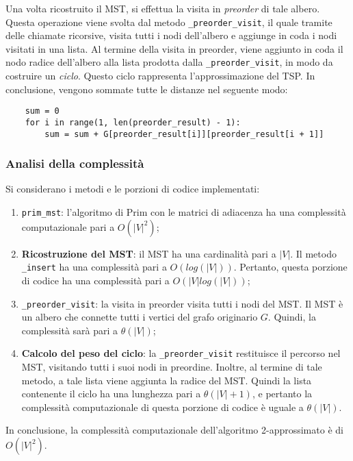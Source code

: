 Una volta ricostruito il MST, si effettua la visita in \textit{preorder} di tale albero. 
Questa operazione viene svolta dal metodo \verb|_preorder_visit|, il quale tramite 
delle chiamate ricorsive, visita tutti i nodi dell'albero e aggiunge in coda i nodi 
visitati in una lista. Al termine della visita in preorder, viene aggiunto in coda 
il nodo radice dell'albero alla lista prodotta dalla \verb|_preorder_visit|, in modo da 
costruire un \textit{ciclo}. Questo ciclo rappresenta l'approssimazione del TSP. 
In conclusione, vengono sommate tutte le distanze nel seguente modo:
\begin{verbatim}
    sum = 0
    for i in range(1, len(preorder_result) - 1):
        sum = sum + G[preorder_result[i]][preorder_result[i + 1]]
\end{verbatim}

\subsubsection{Analisi della complessità}

Si considerano i metodi e le porzioni di codice implementati:
\begin{enumerate}
    \item \verb|prim_mst|: l'algoritmo di Prim con le matrici di adiacenza ha una complessità 
    computazionale pari a $O(|V|^2)$;
    \item \textbf{Ricostruzione del MST}: il MST ha una cardinalità pari a $|V|$. Il metodo 
    \verb|_insert| ha una complessità pari a $O(log(|V|))$. Pertanto, questa porzione di 
    codice ha una complessità pari a $O(|V| log(|V|))$;
    \item \verb|_preorder_visit|: la visita in preorder visita tutti i nodi del MST. Il MST 
    è un albero che connette tutti i vertici del grafo originario $G$. Quindi, la 
    complessità sarà pari a $\theta(|V|)$;
    \item \textbf{Calcolo del peso del ciclo}: la \verb|_preorder_visit| restituisce il 
    percorso nel MST, visitando tutti i suoi nodi in preordine. Inoltre, al termine di 
    tale metodo, a tale lista viene aggiunta la radice del MST. Quindi la lista contenente 
    il ciclo ha una lunghezza pari a $\theta(|V| + 1)$, e pertanto la complessità computazionale 
    di questa porzione di codice è uguale a $\theta(|V|)$.
\end{enumerate}

In conclusione, la complessità computazionale dell'algoritmo 2-approssimato è di $O(|V|^2)$.

